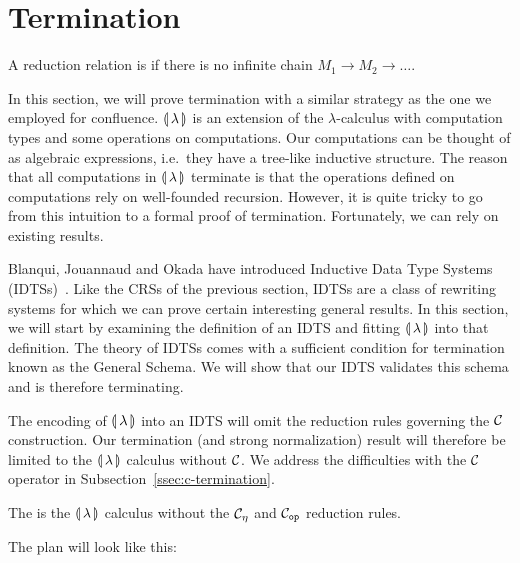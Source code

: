 \section{Termination}
\label{sec:termination}

\begin{definition}
  A reduction relation is  if there is no infinite chain
  $M_1 \to M_2 \to \ldots$.
\end{definition}

In this section, we will prove termination with a similar strategy as the
one we employed for confluence. $\llparenthesis \, \lambda \, \rrparenthesis$ is an extension of the
$\lambda$-calculus with computation types and some operations on
computations. Our computations can be thought of as algebraic expressions,
i.e.\ they have a tree-like inductive structure. The reason that all
computations in $\llparenthesis \, \lambda \, \rrparenthesis$ terminate is that the operations defined on
computations rely on well-founded recursion. However, it is quite tricky to
go from this intuition to a formal proof of termination. Fortunately, we
can rely on existing results.

Blanqui, Jouannaud and Okada have introduced Inductive Data Type Systems
(IDTSs)~\cite{blanqui2002inductive,blanqui2000termination}. Like the CRSs
of the previous section, IDTSs are a class of rewriting systems for which
we can prove certain interesting general results. In this section, we will
start by examining the definition of an IDTS and fitting $\llparenthesis \, \lambda \, \rrparenthesis$
into that definition. The theory of IDTSs comes with a sufficient condition
for termination known as the General Schema. We will show that our IDTS
validates this schema and is therefore terminating.

The encoding of ${\llparenthesis \, \lambda \, \rrparenthesis}$ into an IDTS will omit the reduction rules
governing the $\mathcal{C}$ construction. Our termination (and strong
normalization) result will therefore be limited to the ${\llparenthesis \, \lambda \, \rrparenthesis}$ calculus
without $\mathcal{C}$. We address the difficulties with the $\mathcal{C}$ operator in
Subsection~\ref{ssec:c-termination}.

\begin{notation}
  The  is the
  $\llparenthesis \, \lambda \, \rrparenthesis$ calculus without the $\mathcal{C}_\eta$ and $\mathcal{C}_{\mathtt{op}}$
  reduction rules.
\end{notation}

The plan will look like this:

